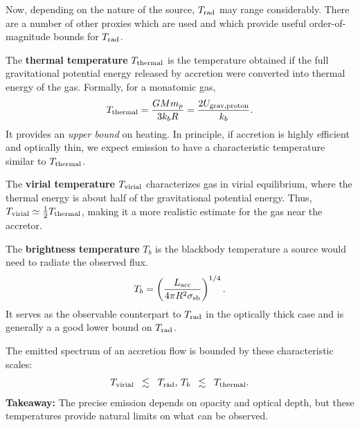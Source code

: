Now, depending on the nature of the source, $T_{\rm rad}$ may range considerably. There are a number of other proxies which are used and which provide useful order-of-magnitude bounds for $T_{\rm rad}$.
\vspace{0.25cm}
\begin{definition}
\label{def:thermal_temperature}
The \textbf{thermal temperature} $T_{\rm thermal}$ is the temperature obtained if the full gravitational potential energy released by accretion were converted into thermal energy of the gas. Formally, for a monatomic gas, 
\begin{equation}
    \label{eq:thermal_temperature}
    T_{\rm thermal} = \frac{GMm_p}{3k_bR}= \frac{2U_{\rm grav, proton}}{k_b}. 
\end{equation}
It provides an \emph{upper bound} on heating. In principle, if accretion is highly efficient and optically thin, we expect emission to have a characteristic temperature similar to $T_{\rm thermal}$.
\end{definition}
\vspace{0.25cm}
\begin{definition}
\label{def:virial_temperature}
The \textbf{virial temperature} $T_{\rm virial}$ characterizes gas in virial equilibrium, where the thermal energy is about half of the gravitational potential energy. 
Thus, $T_{\rm virial} \simeq \tfrac{1}{2}T_{\rm thermal}$, making it a more realistic estimate for the gas near the accretor.
\end{definition}
\vspace{0.25cm}
\begin{definition}
\label{def:brightness_temperature}
The \textbf{brightness temperature} $T_b$ is the blackbody temperature a source would need to radiate the observed flux. 
\begin{equation}
    \label{eq:brightness_temperature}
    T_b = \left(\frac{L_{\rm acc}}{4\pi R^2 \sigma_{\rm sb}}\right)^{1/4}.
\end{equation}
It serves as the observable counterpart to $T_{\rm rad}$ in the optically thick case and is generally a a good lower bound on $T_{\rm rad}$.
\end{definition}
\vspace{0.5cm}

\begin{bigidea}
    The emitted spectrum of an accretion flow is bounded by these characteristic scales:  
    \[
    T_{\rm virial} \;\;\lesssim\;\; T_{\rm rad},\,T_b \;\;\lesssim\;\; T_{\rm thermal}.
    \]  
    \textbf{Takeaway:} The precise emission depends on opacity and optical depth, but these temperatures provide natural limits on what can be observed.
\end{bigidea}

